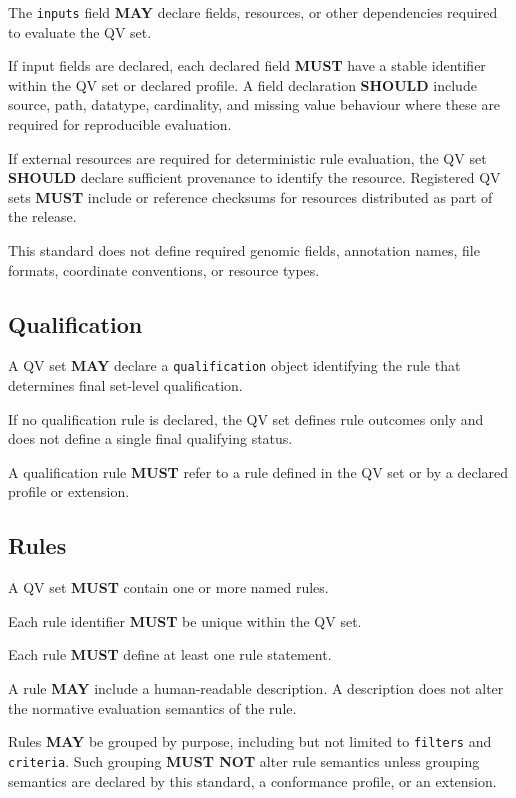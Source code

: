 \documentclass[11pt,a4paper]{article}
\begin{document}
The \texttt{inputs} field \textbf{MAY} declare fields, resources, or other dependencies required to evaluate the QV set.

If input fields are declared, each declared field \textbf{MUST} have a stable identifier within the QV set or declared profile. A field declaration \textbf{SHOULD} include source, path, datatype, cardinality, and missing value behaviour where these are required for reproducible evaluation.

If external resources are required for deterministic rule evaluation, the QV set \textbf{SHOULD} declare sufficient provenance to identify the resource. Registered QV sets \textbf{MUST} include or reference checksums for resources distributed as part of the release.

This standard does not define required genomic fields, annotation names, file formats, coordinate conventions, or resource types.

\subsection{Qualification}

A QV set \textbf{MAY} declare a \texttt{qualification} object identifying the rule that determines final set-level qualification.

If no qualification rule is declared, the QV set defines rule outcomes only and does not define a single final qualifying status.

A qualification rule \textbf{MUST} refer to a rule defined in the QV set or by a declared profile or extension.

\subsection{Rules}

A QV set \textbf{MUST} contain one or more named rules.

Each rule identifier \textbf{MUST} be unique within the QV set.

Each rule \textbf{MUST} define at least one rule statement.

A rule \textbf{MAY} include a human-readable description. A description does not alter the normative evaluation semantics of the rule.

Rules \textbf{MAY} be grouped by purpose, including but not limited to \texttt{filters} and \texttt{criteria}. Such grouping \textbf{MUST NOT} alter rule semantics unless grouping semantics are declared by this standard, a conformance profile, or an extension.
\end{document}
